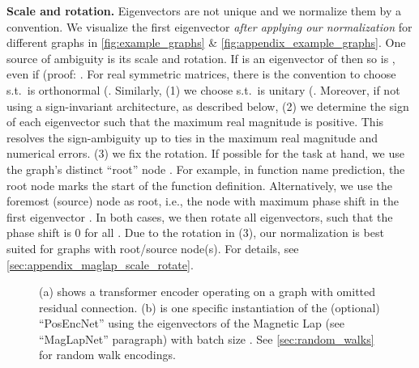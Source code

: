 \documentclass{article}
\begin{document}
\textbf{Scale and rotation.} Eigenvectors are not unique and we normalize them by a convention. We visualize the first eigenvector \emph{after applying our normalization} for different graphs in \autoref{fig:example_graphs} \& \ref{fig:appendix_example_graphs}. One source of ambiguity is its scale and rotation. If  is an eigenvector of  then so is , even if  (proof: . For real symmetric matrices, there is the convention to choose  s.t.\  is orthonormal (. 
Similarly, (1) we choose  s.t.\  is unitary (. Moreover, if not using a sign-invariant architecture, as described below, (2) we determine the sign of each eigenvector such that the maximum real magnitude is positive. This resolves the sign-ambiguity up to ties in the maximum real magnitude and numerical errors. (3) we fix the rotation. If possible for the task at hand, we use the graph's distinct ``root'' node . For example, in function name prediction, the root node marks the start of the function definition. Alternatively, we use the foremost (source) node  as root, i.e., the node with maximum phase shift in the first eigenvector . In both cases, we then rotate all eigenvectors, such that the phase shift  is 0 for all . Due to the rotation in (3), our normalization is best suited for graphs with root/source node(s). For details, see \autoref{sec:appendix_maglap_scale_rotate}.


\begin{figure}[t]
  \centering
  \hfill{}
  \hfill{}
  \hfill{}
  \caption{(a) shows a transformer encoder operating on a graph with omitted residual connection. (b) is one specific instantiation of the (optional) ``PosEncNet'' using the eigenvectors of the Magnetic Lap (see ``MagLapNet'' paragraph) with batch size . See \autoref{sec:random_walks} for random walk encodings.}
  \label{fig:maglapnet_with_trans}
  \vspace{-0.12in}
\end{figure}
\end{document}
